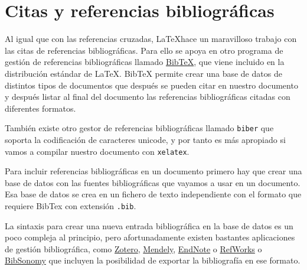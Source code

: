 \documentclass[
  a4paper,
]{scrreport}
\theoremstyle{definition}
\theoremstyle{remark}
\begin{document}

\chapter{Citas y referencias
bibliográficas}\label{citas-y-referencias-bibliogruxe1ficas}

Al igual que con las referencias cruzadas, \LaTeX hace un maravilloso
trabajo con las citas de referencias bibliográficas. Para ello se apoya
en otro programa de gestión de referencias bibliográficas llamado
\href{http://www.bibtex.org/}{BibTeX}, que viene incluido en la
distribución estándar de \LaTeX. BibTeX permite crear una base de datos
de distintos tipos de documentos que después se pueden citar en nuestro
documento y después listar al final del documento las referencias
bibliográficas citadas con diferentes formatos.

También existe otro gestor de referencias bibliográficas llamado
\texttt{biber} que soporta la codificación de caracteres unicode, y por
tanto es más apropiado si vamos a compilar nuestro documento con
\texttt{xelatex}.

Para incluir referencias bibliográficas en un documento primero hay que
crear una base de datos con las fuentes bibliográficas que vayamos a
usar en un documento. Esa base de datos se crea en un fichero de texto
independiente con el formato que requiere BibTex con extensión
\texttt{.bib}.

La sintaxis para crear una nueva entrada bibliográfica en la base de
datos es un poco compleja al principio, pero afortunadamente existen
bastantes aplicaciones de gestión bibliográfica, como
\href{https://www.zotero.org/}{Zotero},
\href{https://www.mendeley.com/}{Mendely},
\href{https://endnote.com/}{EndNote} o
\href{https://refworks.proquest.com/researcher/}{RefWorks} o
\href{https://www.bibsonomy.org/}{BibSonomy} que incluyen la posibilidad
de exportar la bibliografía en ese formato.
\end{document}
